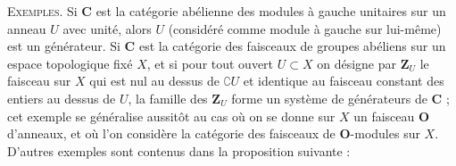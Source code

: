 \textsc{Exemples.} Si $\mathbf{C}$ est la catégorie abélienne des modules à
gauche unitaires sur un anneau $U$ avec unité, alors $U$ (considéré comme
module à gauche sur lui-même) est un générateur. Si $\mathbf{C}$ est la catégorie des
faisceaux de groupes abéliens sur un espace topologique fixé $X$, et si pour
tout ouvert $U\subset X$ on désigne par $\mathbf{Z}_U$ le faisceau sur $X$ qui est nul
au dessus de $\complement U$ et identique au faisceau constant des entiers au dessus de
$U$, la famille des $\mathbf{Z}_U$ forme un système de générateurs de $\mathbf{C}$ ; cet exemple
se généralise aussitôt au cas où on se donne sur $X$ un faisceau $\mathbf{O}$ d'anneaux,
et où l'on considère la catégorie des faisceaux de $\mathbf{O}$-modules sur $X$.
D'autres exemples sont contenus dans la proposition suivante :

